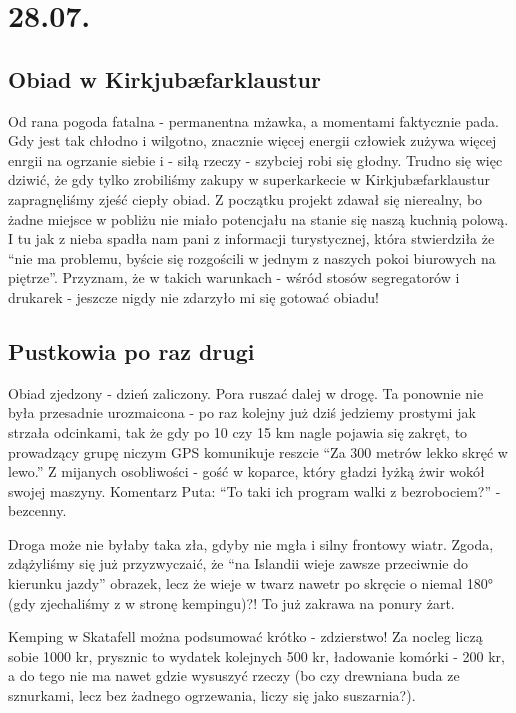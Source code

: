 \chapter{28.07.}

\section{Obiad w Kirkjubæfarklaustur}

Od rana pogoda fatalna - permanentna mżawka, a momentami faktycznie pada. Gdy jest tak chłodno i wilgotno, znacznie więcej energii człowiek zużywa więcej enrgii na ogrzanie siebie i - siłą rzeczy - szybciej robi się głodny. Trudno się więc dziwić, że gdy tylko zrobiliśmy zakupy w superkarkecie w Kirkjubæfarklaustur zapragnęliśmy zjeść ciepły obiad. Z początku projekt zdawał się nierealny, bo żadne miejsce w pobliżu nie miało potencjału na stanie się naszą kuchnią polową. I tu jak z nieba spadła nam pani z informacji turystycznej, która stwierdziła że “nie ma problemu, byście się rozgościli w jednym z naszych pokoi biurowych na piętrze”. Przyznam, że w takich warunkach - wśród stosów segregatorów i drukarek - jeszcze nigdy nie zdarzyło mi się gotować obiadu!


\section{Pustkowia po raz drugi}

Obiad zjedzony - dzień zaliczony. Pora ruszać dalej w drogę. Ta ponownie nie była przesadnie urozmaicona - po raz kolejny już dziś jedziemy prostymi jak strzała odcinkami, tak że gdy po 10 czy 15 km nagle pojawia się zakręt, to prowadzący grupę niczym GPS komunikuje reszcie “Za 300 metrów lekko skręć w lewo.” Z mijanych osobliwości - gość w koparce, który gładzi łyżką żwir wokół swojej maszyny. Komentarz Puta: “To taki ich program walki z bezrobociem?” - bezcenny.


Droga może nie byłaby taka zła, gdyby nie mgła i silny frontowy wiatr. Zgoda, zdążyliśmy się już przyzwyczaić, że “na Islandii wieje zawsze przeciwnie do kierunku jazdy” {obrazek}, lecz że wieje w twarz nawetr po skręcie o niemal 180° (gdy zjechaliśmy z  w stronę kempingu)?! To już zakrawa na ponury żart.

Kemping w Skatafell można podsumować krótko - zdzierstwo! Za nocleg liczą sobie 1000 kr, prysznic to wydatek kolejnych 500 kr, ładowanie komórki - 200 kr, a do tego nie ma nawet gdzie wysuszyć rzeczy (bo czy drewniana buda ze sznurkami, lecz bez żadnego ogrzewania, liczy się jako suszarnia?).
